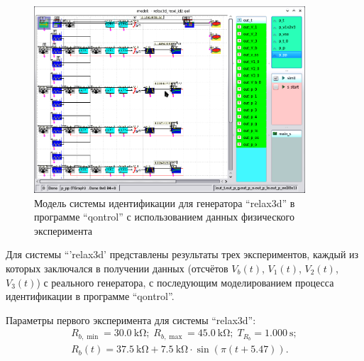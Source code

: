 \begin{figure}[htb!]
  \centerline{\includegraphics[width=0.9\textwidth]{p/relax3d_id_qontrol.png} }
  \caption{Модель системы идентификации для генератора ``relax3d'' в программе ``qontrol'' с использованием данных физического эксперимента}
  \label{atu:f:relax3d_id_qontrol}
\end{figure}

Для системы ``'relax3d' представлены результаты трех экспериментов,
каждый из которых заключался в получении данных
(отсчётов $V_b(t)$, $V_1(t)$, $V_2(t)$, $V_3(t)$) с реального генератора,
с последующим моделированием процесса идентификации в программе ``qontrol''.

Параметры первого эксперимента для системы ``relax3d'':
%
\begin{equation}
  \begin{array}{c}
    R_{b,\min} = \SI{30.0}{\kilo\ohm};
    \;
    R_{b,\max} = \SI{45.0}{\kilo\ohm};
    \;
    T_{R_b} = \SI{1.000}{\second};
  \\
    R_b(t) = \SI{37.5}{\kilo\ohm} + \SI{7.5}{\kilo\ohm} \cdot \sin( \pi ( t + 5.47 ) ).
  \end{array}
  \label{atu:eq:relax3d_test1_cond}
\end{equation}

